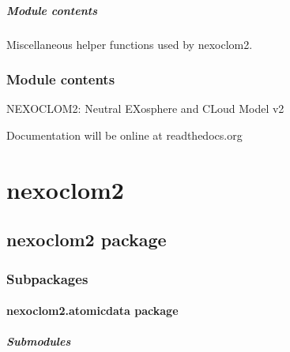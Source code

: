 \documentclass[letterpaper,10pt,english]{sphinxmanual}
\begin{document}
\subparagraph{Module contents}
\label{\detokenize{apidocs/nexoclom2.utilities:module-nexoclom2.utilities}}\label{\detokenize{apidocs/nexoclom2.utilities:module-contents}}
\sphinxAtStartPar
Miscellaneous helper functions used by nexoclom2.


\subsubsection{Module contents}
\label{\detokenize{apidocs/nexoclom2:module-nexoclom2}}\label{\detokenize{apidocs/nexoclom2:module-contents}}
\sphinxAtStartPar
NEXOCLOM2: Neutral EXosphere and CLoud Model v2

\sphinxAtStartPar
Documentation will be online at readthedocs.org

\sphinxstepscope


\section{nexoclom2}
\label{\detokenize{nexoclom2/modules:nexoclom2}}\label{\detokenize{nexoclom2/modules::doc}}
\sphinxstepscope


\subsection{nexoclom2 package}
\label{\detokenize{nexoclom2/nexoclom2:nexoclom2-package}}\label{\detokenize{nexoclom2/nexoclom2::doc}}

\subsubsection{Subpackages}
\label{\detokenize{nexoclom2/nexoclom2:subpackages}}
\sphinxstepscope


\paragraph{nexoclom2.atomicdata package}
\label{\detokenize{nexoclom2/nexoclom2.atomicdata:nexoclom2-atomicdata-package}}\label{\detokenize{nexoclom2/nexoclom2.atomicdata::doc}}

\subparagraph{Submodules}
\label{\detokenize{nexoclom2/nexoclom2.atomicdata:submodules}}
\sphinxstepscope
\end{document}
